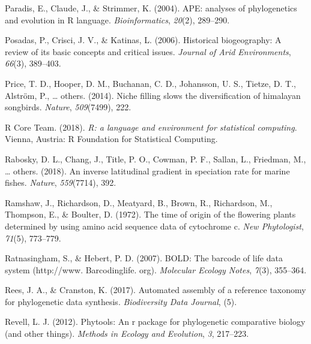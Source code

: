 \documentclass[
  english,
  man]{apa6}
\newlength{\cslhangindent}
\newlength{\cslentryspacingunit} %
\newenvironment{CSLReferences}[2] %
 {%
  \setlength{\parindent}{0pt}
  \ifodd #1
  \let\oldpar\par
  \def\par{\hangindent=\cslhangindent\oldpar}
  \fi
  \setlength{\parskip}{#2\cslentryspacingunit}
 }%
 {}
\begin{document}
\begin{CSLReferences}{1}{0}
\leavevmode{}%
Paradis, E., Claude, J., \& Strimmer, K. (2004). {APE: analyses of phylogenetics and evolution in R language}. \emph{Bioinformatics}, \emph{20}(2), 289--290.

\leavevmode{}%
Posadas, P., Crisci, J. V., \& Katinas, L. (2006). Historical biogeography: A review of its basic concepts and critical issues. \emph{{Journal of Arid Environments}}, \emph{66}(3), 389--403.

\leavevmode{}%
Price, T. D., Hooper, D. M., Buchanan, C. D., Johansson, U. S., Tietze, D. T., Alström, P., \ldots{} others. (2014). Niche filling slows the diversification of himalayan songbirds. \emph{Nature}, \emph{509}(7499), 222.

\leavevmode{}%
R Core Team. (2018). \emph{{R: a language and environment for statistical computing}}. Vienna, Austria: R Foundation for Statistical Computing.

\leavevmode{}%
Rabosky, D. L., Chang, J., Title, P. O., Cowman, P. F., Sallan, L., Friedman, M., \ldots{} others. (2018). An inverse latitudinal gradient in speciation rate for marine fishes. \emph{Nature}, \emph{559}(7714), 392.

\leavevmode{}%
Ramshaw, J., Richardson, D., Meatyard, B., Brown, R., Richardson, M., Thompson, E., \& Boulter, D. (1972). The time of origin of the flowering plants determined by using amino acid sequence data of cytochrome c. \emph{New Phytologist}, \emph{71}(5), 773--779.

\leavevmode{}%
Ratnasingham, S., \& Hebert, P. D. (2007). BOLD: The barcode of life data system (http://www. Barcodinglife. org). \emph{Molecular Ecology Notes}, \emph{7}(3), 355--364.

\leavevmode{}%
Rees, J. A., \& Cranston, K. (2017). Automated assembly of a reference taxonomy for phylogenetic data synthesis. \emph{Biodiversity Data Journal}, (5).

\leavevmode{}%
Revell, L. J. (2012). Phytools: An r package for phylogenetic comparative biology (and other things). \emph{{Methods in Ecology and Evolution}}, \emph{3}, 217--223.


\end{CSLReferences}
\end{document}
